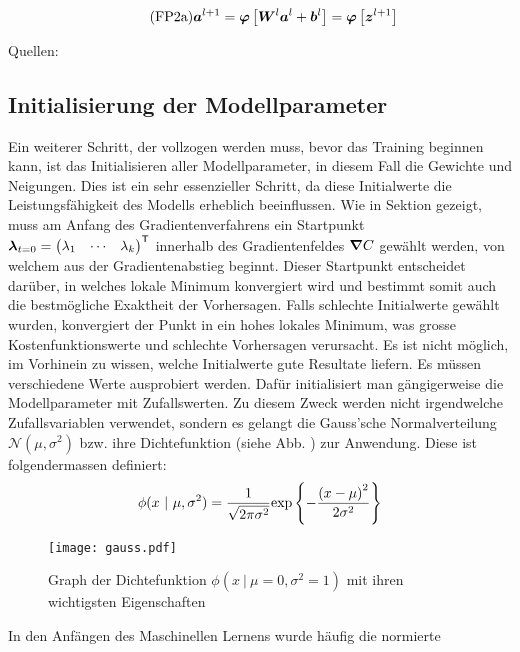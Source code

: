\begin{equation}\tag{FP2a}\label{eq:aktivierung_matrix}
  \bm{a}^{l+1} = \bm{\varphi} \left[\bm{W}^{l} \bm{a}^{l} + \bm{b}^{l} \right] = \bm{\varphi} \left[ \bm{z}^{l+1} \right]
\end{equation}

\para{}
Quellen: \cite{Nielsen}

\subsection{Initialisierung der Modellparameter}\label{sec:parameter_initialisieren}
Ein weiterer Schritt, der vollzogen werden muss, bevor das Training beginnen kann, ist das
Initialisieren aller Modellparameter, in diesem Fall die Gewichte und Neigungen.
Dies ist ein sehr essenzieller Schritt, da diese Initialwerte die
Leistungsfähigkeit des Modells erheblich beeinflussen.
\para{}
Wie in Sektion  gezeigt, muss am Anfang des
Gradientenverfahrens ein Startpunkt $\bm{\lambda}_{t=0} = \begin{pmatrix}
    \lambda_1 & \cdots & \lambda_k \end{pmatrix}^{\mathsf{T}}$ innerhalb des Gradientenfeldes
$\bm{\nabla}C$ gewählt werden, von welchem aus der Gradientenabstieg beginnt.
Dieser Startpunkt entscheidet darüber, in welches lokale Minimum konvergiert
wird und bestimmt somit auch die bestmögliche Exaktheit der Vorhersagen. Falls
schlechte Initialwerte gewählt wurden, konvergiert der Punkt in ein hohes lokales
Minimum, was grosse Kostenfunktionswerte und schlechte Vorhersagen verursacht.
\para{}
Es ist nicht möglich, im Vorhinein zu wissen, welche Initialwerte gute Resultate
liefern. Es müssen verschiedene Werte ausprobiert werden. Dafür initialisiert man gängigerweise die
Modellparameter mit Zufallswerten. Zu diesem Zweck werden nicht irgendwelche
Zufallsvariablen verwendet, sondern es gelangt die Gauss'sche Normalverteilung
$\mathcal{N}(\mu,\sigma^2)$ bzw. ihre Dichtefunktion (siehe Abb. ) zur Anwendung. Diese ist
folgendermassen definiert:
\[\ds \phi(x\ |\ \mu,\sigma^2) = \frac{1}{\sqrt{2\pi\sigma^2}} \text{exp} \left\{-\frac{{(x-\mu)}^2}{2\sigma^2}\right\} \]
\para{}
\begin{figure}[h!]
  \centering
  \texttt{[image: gauss.pdf]}
  \caption{Graph der Dichtefunktion $\phi(x\ |\ \mu=0,\sigma^2=1)$ mit ihren
    wichtigsten Eigenschaften}%
  \label{fig:normalverteilung}
\end{figure}
In den Anfängen des Maschinellen Lernens wurde häufig die normierte
